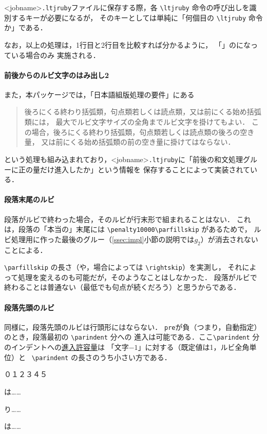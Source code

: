 \documentclass[a4paper,10ptj]{ltjsarticle}
\def\emph#1{\textbf{\textgt{#1}}}
\begin{document}
<jobname>\texttt{.ltjruby}ファイルに保存する際，各 \verb+\ltjruby+ 命令の呼び出しを識別するキーが必要になるが，
そのキーとしては単純に「何個目の \verb+\ltjruby+ 命令か」である．

なお，以上の処理は，1行目と2行目を比較すれば分かるように，
「」の\emph{\underline{前文字進入許容量}指定(\texttt{pre})が自動}になっている場合のみ
実施される．


\paragraph{前後からのルビ文字のはみ出し2}
また，本パッケージでは，「日本語組版処理の要件」にある
\begin{quote}
  後ろにくる終わり括弧類，句点類若しくは読点類，又は前にくる始め括弧類には，
  最大でルビ文字サイズの全角までルビ文字を掛けてもよい．
  この場合，後ろにくる終わり括弧類，句点類若しくは読点類の後ろの空き量，
  又は前にくる始め括弧類の前の空き量に掛けてはならない．
\end{quote}
という処理も組み込まれており，<jobname>\texttt{.ltjruby}に「前後の和文処理グルーに正の量だけ進入したか」という情報を
保存することによって実装されている．

\paragraph{段落末尾のルビ}
段落がルビで終わった場合，そのルビが行末形で組まれることはない．
これは，段落の「本当の」末尾には \verb+\penalty10000\parfillskip+ があるためで，
ルビ処理用に作った最後のグルー（\ref{ssec:impl}\nobreak 小節の説明では$g_2$）が消去されないことによる．

\verb+\parfillskip+ の長さ（や，場合によっては \verb+\rightskip+）を実測し，
それによって処理を変えるのも可能だが，そのようなことはしなかった．
段落がルビで終わることは普通ない（最低でも句点が続くだろう）と思うからである．

\paragraph{段落先頭のルビ}
同様に，段落先頭のルビは行頭形にはならない．
\texttt{pre}が負（つまり，自動指定）のとき，段落最初の \verb+\parindent+ 分への
進入は可能である．ここ\verb+\parindent+ 分のインデントへの\underline{進入許容量}は
「文字$-1$」に対する（既定値は1，ルビ全角単位）と
\ \verb+\parindent+ の長さのうち小さい方である．
\begin{LTXexample}[preset=\Large,width=0.4\textwidth]
\zw\noindent ０１２３４５\par
{}は……\par
{}り……\par
{}\zw{}は……
\end{LTXexample}
\end{document}
